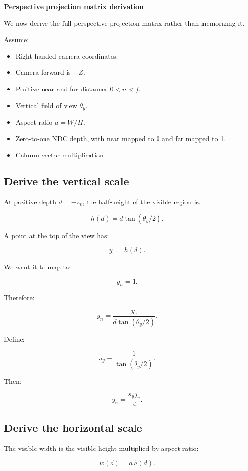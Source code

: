 \textbf{Perspective projection matrix derivation}

We now derive the full perspective projection matrix rather than memorizing it.

Assume:

\begin{itemize}
\tightlist
\item
  Right-handed camera coordinates.
\item
  Camera forward is \(-Z\).
\item
  Positive near and far distances \(0<n<f\).
\item
  Vertical field of view \(\theta_y\).
\item
  Aspect ratio \(a=W/H\).
\item
  Zero-to-one NDC depth, with near mapped to 0 and far mapped to 1.
\item
  Column-vector multiplication.
\end{itemize}

\subsection{Derive the vertical scale}\label{02-foundations-ii-ch033-derive-the-vertical-scale}

At positive depth \(d=-z_v\), the half-height of the visible region is:

\[
 h(d)=d\tan(\theta_y/2).
\]

A point at the top of the view has:

\[
 y_v=h(d).
\]

We want it to map to:

\[
 y_n=1.
\]

Therefore:

\[
 y_n= \frac{y_v}{d\tan(\theta_y/2)}.
\]

Define:

\[
 \boxed{ s_y=\frac1{\tan(\theta_y/2)} }.
\]

Then:

\[
 \boxed{ y_n=\frac{s_yy_v}{d} }.
\]

\subsection{Derive the horizontal scale}\label{02-foundations-ii-ch033-derive-the-horizontal-scale}

The visible width is the visible height multiplied by aspect ratio:

\[
 w(d)=a\,h(d).
\]


